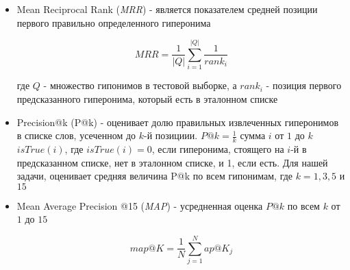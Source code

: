 \begin{itemize}

\item Mean Reciprocal Rank (\textit{MRR}) - является показателем средней позиции первого правильно определенного гиперонима

$$MRR= \frac{1}{|Q|} \sum^{|Q|}_{i=1} \frac{1}{rank_i}$$

где $Q$ - множество гипонимов в тестовой выборке, а
$rank_i$ - позиция первого предсказанного гиперонима, который
есть в эталонном списке

\item Precision@k (P@k) - оценивает долю правильных извлеченных гиперонимов в списке
слов, усеченном до $k$-й позициии.
$P@k = \frac{1}{k}$ сумма $i$ от $1$ до $k$ $isTrue(i)$, где $isTrue(i) = 0$, если гиперонима, стоящего на $i$-й в
предсказанном списке, нет в эталонном списке, и 1, если есть.
Для нашей задачи, оценивает средняя величина P@k по всем гипонимам, где $k = 1, 3, 5$ и
$15$

\item Mean Average Precision @15 (\textit{MAP}) - усредненная оценка $P@k$ по всем $k$ от $1$ до $15$

$$map@K = \frac{1}{N} \sum^N_{j=1} ap@K_j$$

\end{itemize}
